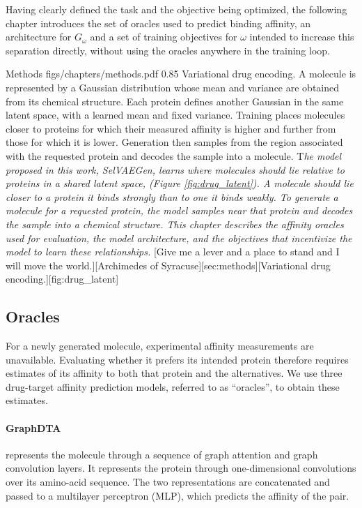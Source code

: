 \documentclass[a4paper,12pt]{article}
\begin{document}
Having clearly defined the task and the objective being optimized, the following chapter introduces the set of oracles used to predict binding affinity, an architecture for $G_\omega$ and a set of
training objectives for $\omega$ intended to increase this separation directly, without
using the oracles anywhere in the training loop.

\chapteropening
{Methods}
{figs/chapters/methods.pdf}
{0.85\textwidth}
{Variational drug encoding. A molecule is represented by a Gaussian distribution whose mean and variance are obtained from its chemical structure. Each protein defines another Gaussian in the same latent space, with a learned mean and fixed variance. Training places molecules closer to proteins for which their measured affinity is higher and further from those for which it is lower. Generation then samples from the region associated with the requested protein and decodes the sample into a molecule.}
{%
    \lettrine[
        lines=2,
        lhang=0.0,
        loversize=0.0
    ]{T}{}\textit{he model proposed in this work, SelVAEGen, learns where molecules should lie
        relative to proteins in a shared latent space, (Figure \ref{fig:drug_latent}). A molecule should lie closer to a protein it binds
        strongly than to one it binds weakly. To generate a molecule for a requested
        protein, the model samples near that protein and decodes the sample into a
        chemical structure. This chapter describes the affinity oracles used for
        evaluation, the model architecture, and the objectives that incentivize the model to learn these
        relationships.}
}[Give me a lever and a place to stand and I will move the world.][Archimedes of Syracuse][sec:methods][Variational drug encoding.][fig:drug_latent]

\subsection{Oracles}
For a newly generated molecule, experimental affinity measurements are unavailable. Evaluating whether it prefers its intended protein therefore requires estimates of its affinity to both that protein and the alternatives. We use three drug-target affinity prediction models, referred to as ``oracles'', to obtain these estimates.

\paragraph{GraphDTA {\normalfont\parencite{Nguyen_Le_Quinn_Nguyen_Le_Venkatesh_2020}}} represents the molecule through a sequence of graph attention and graph convolution layers. It represents the protein through one-dimensional convolutions over its amino-acid sequence. The two representations are concatenated and passed to a multilayer perceptron (MLP), which predicts the affinity of the pair.
\end{document}
